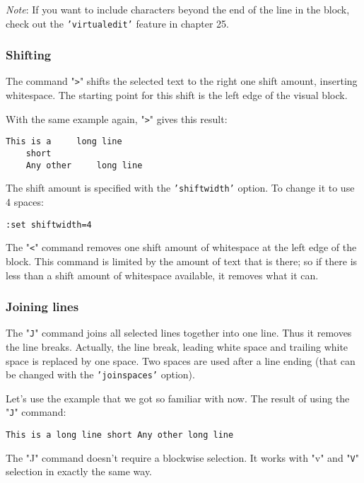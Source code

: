 \emph{Note}:
If you want to include characters beyond the end of the line in the block, check out the \texttt{'virtualedit'} feature in chapter 25.

\subsubsection{Shifting}
The command "\texttt{>}" shifts the selected text to the right one shift amount, inserting whitespace.
The starting point for this shift is the left edge of the visual block.

With the same example again, "\texttt{>}" gives this result:

\begin{Verbatim}[samepage=true]
    This is a     long line 
    short 
    Any other     long line 
\end{Verbatim}

The shift amount is specified with the \texttt{'shiftwidth'} option.
To change it to use 4 spaces:

\begin{Verbatim}[samepage=true]
 :set shiftwidth=4
\end{Verbatim}

The "\texttt{<}" command removes one shift amount of whitespace at the left edge of the block.
This command is limited by the amount of text that is there; so if there is less than a shift amount of whitespace available, it removes what it can.


\subsubsection{Joining lines}
The "\texttt{J}" command joins all selected lines together into one line.
Thus it removes the line breaks.
Actually, the line break, leading white space and trailing white space is replaced by one space.
Two spaces are used after a line ending (that can be changed with the \texttt{'joinspaces'} option).

Let's use the example that we got so familiar with now.
The result of using the "\texttt{J}" command:

\begin{Verbatim}[samepage=true]
    This is a long line short Any other long line 
\end{Verbatim}

The "J" command doesn't require a blockwise selection.
It works with "v" and "\texttt{V}" selection in exactly the same way.


